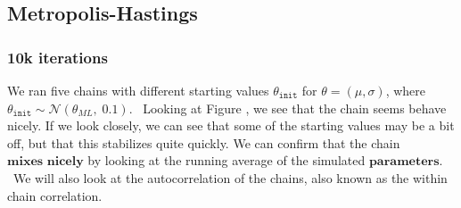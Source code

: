 \begin{figure}
    \label{fig:autocorrelation_10k_02_06}%
\end{figure}


\subsection*{Metropolis-Hastings}\label{subsec:mh_sim}
\subsubsection{10k iterations}
We ran five chains with different starting values $\theta_{\texttt{init}}$ for $\theta = \left(\mu, \sigma\right)$, where $\theta_{\texttt{init}} \sim \mathcal{N}\left(\theta_{ML}, \; 0.1\right)$. 
\
Looking at Figure , we see that the chain seems behave nicely. If we look closely, we can see that some of the starting values may be a bit off, but that this stabilizes quite quickly. We can confirm that the chain $\textbf{mixes nicely}$ by looking at the running average of the simulated $\textbf{parameters}$.
\
We will also look at the autocorrelation of the chains, also known as the within chain correlation. 

